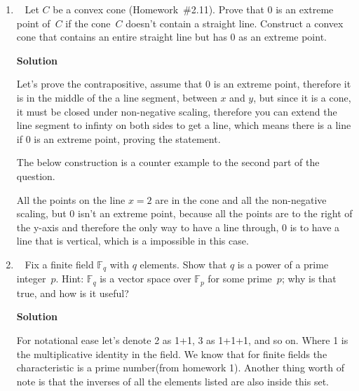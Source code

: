 \documentclass[11pt]{article}
\newcommand\score[1]{\marginpar{\vspace{-2ex}\color{blue}{#1/14}}\hspace{-1ex}}
\newcommand\0{\mathbf{0}}
\newcommand\FF{\mathbb{F}}
\newcommand\<{\langle}
\renewcommand\>{\rangle}
\begin{document}
\begin{enumerate}
\item\ \score{}%
Let $C$ be a convex cone (Homework~\#2.11).  Prove that $0$ is an
extreme point of~$C$ if the cone~$C$ doesn't contain a straight line.
Construct a convex cone that contains an entire straight line but has
$0$ as an extreme point.

\textbf{Solution}

Let's prove the contrapositive, assume that 0 is an extreme point, therefore it is in the middle of the a line segment,
between $x$ and $y$, but since it is a cone, it must be closed under non-negative scaling, therefore
you can extend the line segment to infinty on both sides to get a line, which means there is a line if 0 is 
an extreme point, proving the statement.

The below construction is a counter example to the second part of the question.

\begin{center}
\end{center}

All the points on the line $x=2$ are in the cone and all the non-negative scaling, but 0 isn't an extreme point, because
all the points are to the right of the y-axis and therefore the only way to have a line through,
0 is to have a line that is vertical, which is a impossible in this case.


\item\ \score{}%
Fix a finite field $\FF_q$ with $q$ elements.  Show that $q$ is a
power of a prime integer~$p$.  Hint: $\FF_q$ is a vector space over
$\FF_p$ for some prime~$p$; why is that true, and how is it useful?

\textbf{Solution}

For notational ease let's denote 2 as 1+1, 3 as 1+1+1, and so on. 
Where 1 is the multiplicative identity in the field. We know
that for finite fields the characteristic is a prime number(from homework 1). Another thing worth of note 
is that the inverses of all the elements listed are also inside this set.


\end{enumerate}
\end{document}
